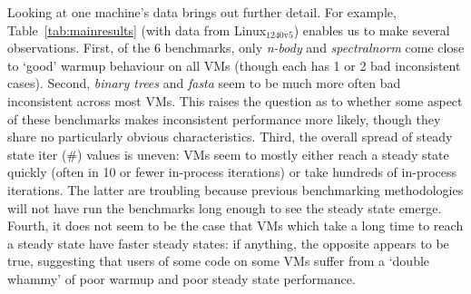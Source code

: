 \documentclass[acmsmall]{acmart}\settopmatter{printfolios=true}
\newcommand{\binarytrees}{\emph{binary trees}\xspace}
\newcommand{\spectralnorm}{\emph{spectralnorm}\xspace}
\newcommand{\nbody}{\emph{n-body}\xspace}
\newcommand{\fasta}{\emph{fasta}\xspace}
\newcommand{\bencherseven}{Linux$_\mathrm{1240v5}$\xspace}
\DeclareRobustCommand{\warmup}{%
\setlength{\sparklinethickness}{0.4pt}%
\begin{sparkline}{1.5}
\spark 0.1 0.8
       0.5 0.8
       0.5 0.0
       0.9 0.0
       /%
\end{sparkline}\xspace%
}
\DeclareRobustCommand{\slowdown}{%
\setlength{\sparklinethickness}{0.4pt}%
\begin{sparkline}{1.5}
\spark 0.1 0.0
       0.5 0.0
       0.5 0.8
       0.9 0.8
       /%
\end{sparkline}\xspace%
}
\DeclareRobustCommand{\badinconsistent}{%
\setlength{\sparklinethickness}{0.4pt}%
\begin{sparkline}{1.5}
\spark 0.1 0.4
       0.9 0.4
       /%
\spark 0.1 0.2
       0.9 0.2
       /%
\spark 0.1 0.6
       0.9 0.0
       /%
\spark 0.1 0.0
       0.9 0.6
       /%
\end{sparkline}\xspace%
}
\begin{document}
Looking at one machine's data brings out further detail. For
example, Table~\ref{tab:mainresults} (with data from \bencherseven)
enables us to make several observations. First, of the 6 benchmarks, only \nbody and \spectralnorm
come close to `good' warmup behaviour on all VMs (though each has 1 or 2 bad
inconsistent cases). Second, \binarytrees and \fasta seem to be much more often
bad inconsistent across most VMs. This raises the question as to whether some
aspect of these benchmarks makes inconsistent performance more likely,
though they share no particularly obvious characteristics.
Third, the overall spread of steady state iter (\#) values is uneven: VMs seem
to mostly either reach a steady state quickly (often in 10 or fewer in-process
iterations) or take hundreds of in-process iterations. The latter are troubling
because previous benchmarking methodologies
will not have run the benchmarks long enough to see the steady state emerge.
Fourth, it does not seem to be the case that VMs which take a long
time to reach a steady state have faster steady states: if anything,
the opposite appears to be true, suggesting that users of some code
on some VMs suffer from a `double whammy' of poor warmup and poor
steady state performance.


\end{document}
